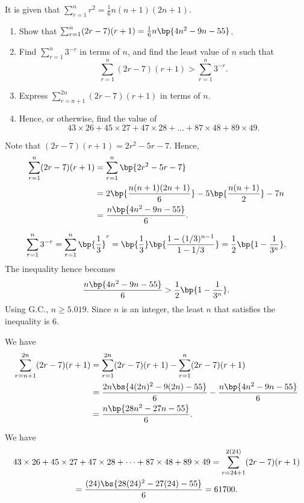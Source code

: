 \clearpage
\begin{problem}
    It is given that $\sum_{r = 1}^n r^2 = \frac16 n(n+1)(2n+1)$.
    \begin{enumerate}
        \item Show that $\sum_{r = 1}^n (2r-7)(r+1) = \frac16 n\bp{4n^2 - 9n - 55}$.
        \item Find $\sum_{r = 1}^n 3^{-r}$ in terms of $n$, and find the least value of $n$ such that \[\sum_{r = 1}^n (2r-7)(r + 1) > \sum_{r = 1}^n 3^{-r}.\]
        \item Express $\sum_{r = n + 1}^{2n} (2r-7)(r+1)$ in terms of $n$.
        \item Hence, or otherwise, find the value of \[43\times26 + 45\times27 + 47\times28 + \dots +87\times48 + 89\times49.\]
    \end{enumerate}
\end{problem}
\begin{solution}
    \begin{ppart}
        Note that $(2r-7)(r+1) = 2r^2 -5r -7$. Hence,
        \begin{align*}
            \sum_{r = 1}^n (2r-7)(r+1) &= \sum_{r = 1}^n \bp{2r^2 - 5r - 7}\\
            &= 2\bp{\frac{n(n+1)(2n+1)}6} - 5\bp{\frac{n(n+1)}2} - 7n\\
            &= \frac{n\bp{4n^2 - 9n - 55}}6.
        \end{align*}
    \end{ppart}
    \begin{ppart}
        \[\sum_{r = 1}^n 3^{-r} = \sum_{r = 1}^n \bp{\frac13}^r = \bp{\frac13} \bp{\frac{1 - (1/3)^{n-1}}{1 - 1/3}} = \frac12 \bp{1 - \frac1{3^n}}.\] The inequality hence becomes \[\frac{n\bp{4n^2 - 9n - 55}}6 > \frac12 \bp{1 - \frac1{3^n}}.\] Using G.C., $n \geq 5.019$. Since $n$ is an integer, the least $n$ that satisfies the inequality is 6.
    \end{ppart}
    \begin{ppart}
        We have
        \begin{align*}
            \sum_{r = n + 1}^{2n} (2r-7)(r+1) &= \sum_{r = 1}^{2n} (2r-7)(r+1) - \sum_{r = 1}^{n} (2r-7)(r+1)\\
            &= \frac{2n\bs{4(2n)^2 - 9(2n) - 55}}6 - \frac{n\bp{4n^2 - 9n - 55}}6\\
            &= \frac{n\bp{28n^2 - 27n - 55}}6.
        \end{align*}
    \end{ppart}
    \begin{ppart}
        We have
        \begin{gather*}
            43\times26 + 45\times27 + 47\times28 + \dots +87\times48 + 89\times49 = \sum_{r = 24 + 1}^{2(24)} (2r-7)(r+1)\\
            = \frac{(24)\bs{28(24)^2 - 27(24) - 55}}6 = 61700.
        \end{gather*}
    \end{ppart}
\end{solution}


